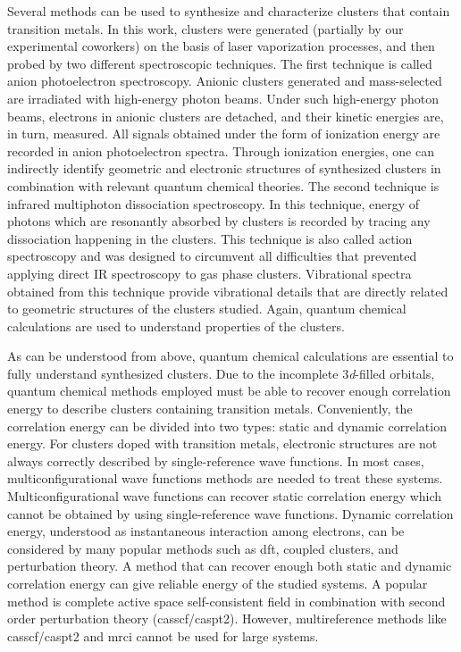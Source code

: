 \begin{refsection}
Several methods can be used to synthesize and characterize clusters that contain transition metals. In this work, clusters were generated (partially by our experimental coworkers) on the basis of laser vaporization processes, and then probed by two different spectroscopic techniques. The first technique is called anion photoelectron spectroscopy. Anionic clusters generated and mass-selected are irradiated with high-energy photon beams. Under such high-energy photon beams, electrons in anionic clusters are detached, and their kinetic energies are, in turn, measured. All signals obtained under the form of ionization energy are recorded in anion photoelectron spectra. Through ionization energies, one can indirectly identify geometric and electronic structures of synthesized clusters in combination with relevant quantum chemical theories. The second technique is infrared multiphoton dissociation spectroscopy. In this technique, energy of photons which are resonantly absorbed by clusters is recorded by tracing any dissociation happening in the clusters. \cite{c1:5} This technique is also called action spectroscopy and was designed to circumvent all difficulties that prevented applying direct IR spectroscopy to gas phase clusters. Vibrational spectra obtained from this technique provide vibrational details that are directly related to geometric structures of the clusters studied. Again, quantum chemical calculations are used to understand properties of the clusters. 



As can be understood from above, quantum chemical calculations are essential to fully understand synthesized clusters. Due to the incomplete 3\textit{d}-filled orbitals, quantum chemical methods employed must be able to recover enough correlation energy to describe clusters containing transition metals. Conveniently, the correlation energy can be divided into two types: static and dynamic correlation energy. For clusters doped with transition metals, electronic structures are not always correctly described by single-reference wave functions. In most cases, multiconfigurational wave functions methods are needed to treat these systems. Multiconfigurational wave functions can recover static correlation energy which cannot be obtained by using single-reference wave functions. Dynamic correlation energy, understood as instantaneous interaction among electrons, can be considered by many popular methods such as \acrshort{dft}, coupled clusters, and perturbation theory. A method that can recover enough both static and dynamic correlation energy can give reliable energy of the studied systems. A popular method is complete active space self-consistent field in combination with second order perturbation theory (\acrshort{casscf}/\acrshort{caspt2}). However, multireference methods like \acrshort{casscf}/\acrshort{caspt2} and \acrshort{mrci} cannot be used for large systems. 




\end{refsection}
